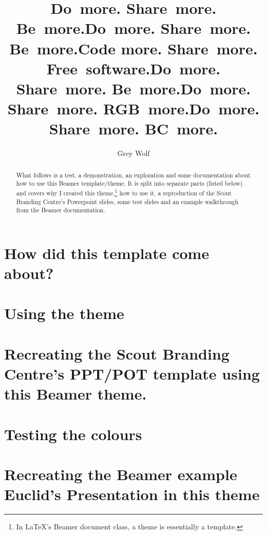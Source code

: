 \documentclass[aspectratio=169,utf8,t]{beamer}
\author{Grey Wolf}
\institute{\href{https://mansouthscouts.org.uk/our-groups/23rdManchester}{23rd~Manchester}
\\\href{https://mansouthscouts.org.uk/our-groups/23rdManchester}{(Birch~with~Fallowfield)}}
\title{Do~more. Share~more. Be~more.}
\begin{document}
\logoslide[noheadlogo]

\begin{frame}
\begin{abstract}
What follows is a test, a demonstration, an exploration and some documentation about how to use this Beamer template/theme.  It is split into separate parts (listed below) and covers why I created this theme,\footnote{In \LaTeX{}'s Beamer document class, a theme is essentially a template.} how to use it, a reproduction of the Scout Branding Centre's Powerpoint slides, some test slides and an example walkthrough from the Beamer documentation.
\end{abstract}
\end{frame}


\title{Do~more. Share~more. Be~more.}
\part{How did this template come about?}


\title{Code more. Share~more. Free~software.} 
\part{Using the theme}


\title{Do~more. Share~more. Be~more.}
\headervisibility[separate]
\part{Recreating the Scout Branding Centre's PPT/POT template using this Beamer theme.}

\headervisibility
\title{Do~more. Share~more. RGB~more.}
\part{Testing the colours}

\title{Do~more. Share~more. BC~more.}
\part{Recreating the Beamer example Euclid’s Presentation in this theme}
\end{document}
